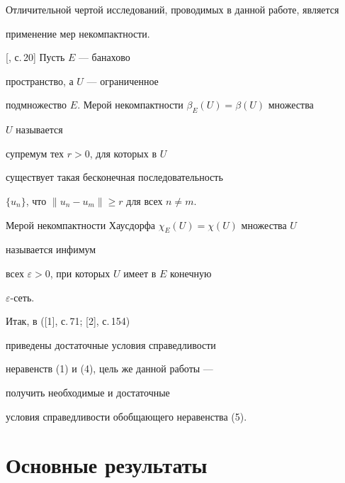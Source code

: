  


Отличительной чертой исследований, проводимых в данной работе, является 


применение мер некомпактности. 


 


\begin{defn}%


[{\selectfont [3], с.\,20}] Пусть $E$ --- банахово 


пространство, а $U$ --- ограниченное  


подмножество $E$. Мерой некомпактности $\beta_E(U)=\beta(U)$ множества 


$U$ называется  


супремум тех $r>0$, для которых в $U$ 


существует такая бесконечная последовательность  


$\{u_n\}$, что $\|u_n-u_m\|\ge r$ для всех $n\ne m$. 


\end{defn} 


 


Мерой некомпактности Хаусдорфа $\chi_E(U)=\chi(U)$ множества $U$ 


называется инфимум  


всех $\varepsilon>0$, при которых $U$ имеет в $E$ конечную 


$\varepsilon$-сеть.  


 


Итак, в ([1], с.\,71; [2], с.\,154) 


приведены достаточные условия справедливости 


неравенств (1) и (4), цель же данной работы --- 


получить необходимые и достаточные  


условия справедливости обобщающего неравенства (5). 


 


\section{Основные результаты} 


 


